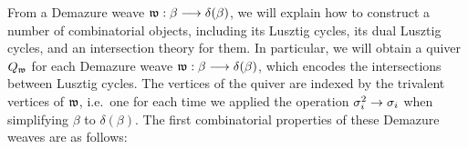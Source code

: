 From a Demazure weave $\mathfrak{w}:\beta\longrightarrow\delta(\beta)$, we will explain how to construct a number of combinatorial objects, including its Lusztig cycles, its dual Lusztig cycles, and an intersection theory for them. In particular, we will obtain a quiver $Q_{\mathfrak{w}}$ for each Demazure weave $\mathfrak{w}:\beta\longrightarrow\delta(\beta)$, which encodes the intersections between Lusztig cycles. The vertices of the quiver are indexed by the trivalent vertices of $\mathfrak{w}$, i.e.~one for each time we applied the operation $\sigma_i^2\to\sigma_i$ when simplifying $\beta$ to $\delta(\beta)$. The first combinatorial properties of these Demazure weaves are as follows:


